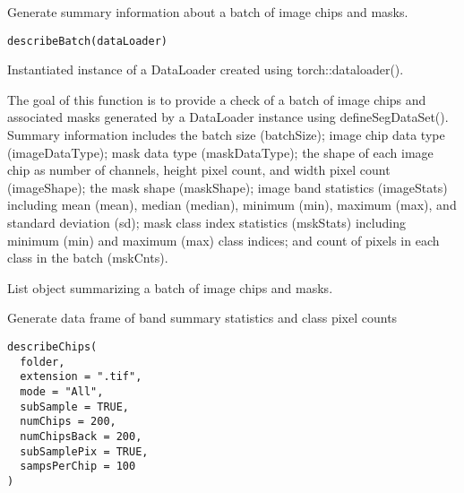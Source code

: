 \documentclass[a4paper]{book}
\begin{document}
%
\begin{Description}\relax
Generate summary information about a batch of image chips and masks.
\end{Description}
%
\begin{Usage}
\begin{verbatim}
describeBatch(dataLoader)
\end{verbatim}
\end{Usage}
%
\begin{Arguments}
\begin{ldescription}
\item[\code{dataLoader}] Instantiated instance of a DataLoader created using torch::dataloader().
\end{ldescription}
\end{Arguments}
%
\begin{Details}\relax
The goal of this function is to provide a check of a batch of image chips and associated
masks generated by a DataLoader instance using defineSegDataSet(). Summary information includes the batch size
(batchSize); image chip data type (imageDataType); mask data type (maskDataType); the shape of each
image chip as number of channels, height pixel count, and width pixel count (imageShape); the mask shape
(maskShape); image band statistics (imageStats) including mean (mean), median (median), minimum (min),
maximum (max), and standard deviation (sd); mask class index statistics (mskStats) including minimum (min)
and maximum (max) class indices; and count of pixels in each class in the batch (mskCnts).
\end{Details}
%
\begin{Value}
List object summarizing a batch of image chips and masks.
\end{Value}
%
\begin{Description}\relax
Generate data frame of band summary statistics and class pixel counts
\end{Description}
%
\begin{Usage}
\begin{verbatim}
describeChips(
  folder,
  extension = ".tif",
  mode = "All",
  subSample = TRUE,
  numChips = 200,
  numChipsBack = 200,
  subSamplePix = TRUE,
  sampsPerChip = 100
)
\end{verbatim}
\end{Usage}
%
\end{document}
